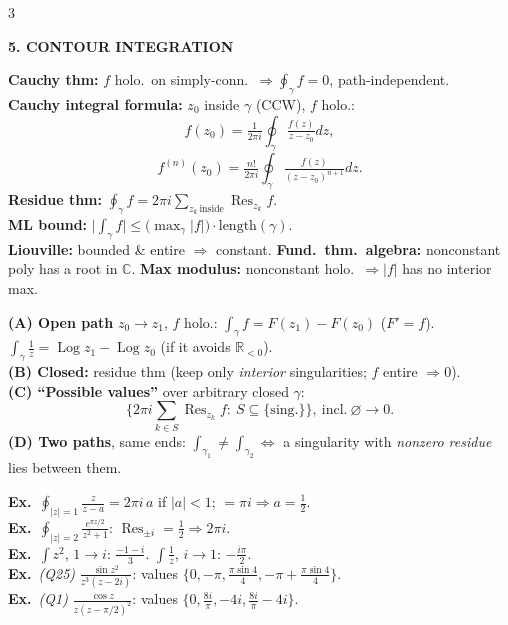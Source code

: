 \documentclass[a4paper,8pt]{extarticle}
\newcommand{\topic}[2]{%
  \vspace{4.5pt}%
  {\colorbox{#1}{\parbox{\dimexpr\columnwidth-2\fboxsep}{\color{white}\bfseries\footnotesize #2}}}\par\vspace{2.5pt}}
\newcommand{\exo}{\textbf{\textcolor{cA}{Ex.}}\ }
\newcommand{\R}{\mathbb{R}}
\newcommand{\C}{\mathbb{C}}
\newcommand{\Res}{\operatorname{Res}}
\newcommand{\half}{\tfrac12}
\newcommand{\ds}{\displaystyle}
\newcommand{\To}{\!\to\!}
\begin{document}
\begin{multicols}{3}
\topic{cA}{5. CONTOUR INTEGRATION}
\begin{thm}
\textbf{Cauchy thm:} $f$ holo.\ on simply-conn.\ $\Rightarrow\oint_\gamma f{=}0$, path-independent.\\
\textbf{Cauchy integral formula:} $z_0$ inside $\gamma$ (CCW), $f$ holo.:
\[ f(z_0)=\tfrac1{2\pi i}\oint_\gamma\tfrac{f(z)}{z-z_0}dz,\]
\[ f^{(n)}(z_0)=\tfrac{n!}{2\pi i}\oint_\gamma\tfrac{f(z)}{(z-z_0)^{n+1}}dz.\]
\textbf{Residue thm:} $\ds\oint_\gamma f=2\pi i\!\!\sum_{z_k\,\text{inside}}\!\!\Res_{z_k}f$.\\
\textbf{ML bound:} $\big|\int_\gamma f\big|\le \big(\max_\gamma|f|\big)\cdot\text{length}(\gamma)$.\\
\textbf{Liouville:} bounded \& entire $\Rightarrow$ constant. \textbf{Fund.\ thm.\ algebra:} nonconstant poly has a root in $\C$. \textbf{Max modulus:} nonconstant holo.\ $\Rightarrow|f|$ has no interior max.
\end{thm}
\textbf{(A) Open path} $z_0\To z_1$, $f$ holo.: $\int_\gamma f=F(z_1){-}F(z_0)$ ($F'{=}f$). $\int_\gamma\frac1z=\operatorname{Log}z_1{-}\operatorname{Log}z_0$ (if it avoids $\R_{<0}$).\\
\textbf{(B) Closed:} residue thm (keep only \emph{interior} singularities; $f$ entire $\Rightarrow0$).\\
\textbf{(C) ``Possible values''} over arbitrary closed $\gamma$:
\[ \big\{2\pi i\!\sum_{k\in S}\Res_{z_k}f:\ S\subseteq\{\text{sing.}\}\big\},\ \text{incl.}\ \varnothing\To0.\]
\textbf{(D) Two paths}, same ends: $\int_{\gamma_1}\!\ne\!\int_{\gamma_2}\!\iff$ a singularity with \emph{nonzero residue} lies between them.
\begin{ex}
\exo $\oint_{|z|=1}\frac{z}{z-a}{=}2\pi i\,a$ if $|a|{<}1$; $={\pi i}\Rightarrow a{=}\half$.\\
\exo $\oint_{|z|=2}\frac{e^{\pi z/2}}{z^2+1}$: $\Res_{\pm i}{=}\half\Rightarrow 2\pi i$.\\
\exo $\int z^2$, $1\To i$: $\frac{-1-i}{3}$. \;$\int\frac1z$, $i\To1$: $-\frac{i\pi}{2}$.\\
\exo \emph{(Q25)} $\frac{\sin z^2}{z^3(z-2i)}$: values $\{0,{-}\pi,\frac{\pi\sin4}4,{-}\pi{+}\frac{\pi\sin4}4\}$.\\
\exo \emph{(Q1)} $\frac{\cos z}{z(z-\pi/2)^2}$: values $\{0,\frac{8i}\pi,{-}4i,\frac{8i}\pi{-}4i\}$.
\end{ex}


\end{multicols}
\end{document}
